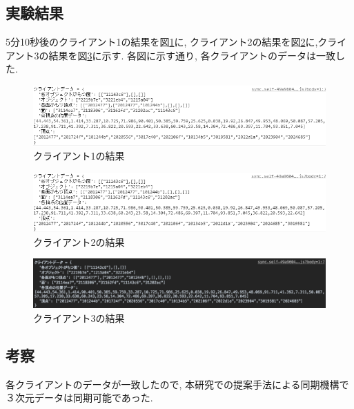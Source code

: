 \subsection{実験結果}
5分10秒後のクライアント1の結果を図\ref{kekka1}に, クライアント2の結果を図\ref{kekka2}に,クライアント3の結果を図\ref{kekka3}に示す.
各図に示す通り, 各クライアントのデータは一致した.
\begin{figure}[htbp]
 \begin{center}
	 \includegraphics[scale=0.7]{images/kekka1}
	 \caption{クライアント1の結果}
	 \label{kekka1}
 \end{center}
\end{figure}
\begin{figure}[htbp]
 \begin{center}
	 \includegraphics[scale=0.7]{images/kekka2}
	 \caption{クライアント2の結果}
	 \label{kekka2}
 \end{center}
\end{figure}
\begin{figure}[htbp]
 \begin{center}
	 \includegraphics[scale=0.35]{images/kekka3}
	 \caption{クライアント3の結果}
	 \label{kekka3}
 \end{center}
\end{figure}


\subsection{考察}
各クライアントのデータが一致したので,
本研究での提案手法による同期機構で３次元データは同期可能であった.
